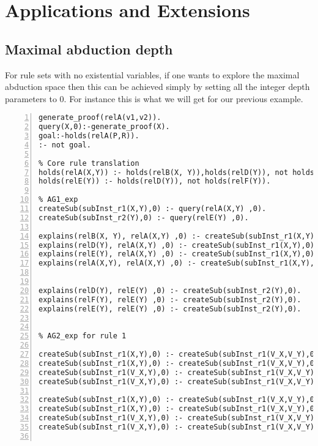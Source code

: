 \section{Applications and Extensions}\label{sec:applications_extensions}

\subsection{Maximal abduction depth}
For rule sets with no existential variables, if one wants to explore the maximal abduction space then this can be achieved simply by setting all the integer depth parameters to 0. For instance this is what we will get for our previous example.
\begin{lstlisting}[numbers=left]
% Encoding the goal
generate_proof(relA(v1,v2)).
query(X,0):-generate_proof(X).
goal:-holds(relA(P,R)).
:- not goal.

% Core rule translation
holds(relA(X,Y)) :- holds(relB(X, Y)),holds(relD(Y)), not holds(relE(Y)).
holds(relE(Y)) :- holds(relD(Y)), not holds(relF(Y)).

% AG1_exp
createSub(subInst_r1(X,Y),0) :- query(relA(X,Y) ,0).
createSub(subInst_r2(Y),0) :- query(relE(Y) ,0).

explains(relB(X, Y), relA(X,Y) ,0) :- createSub(subInst_r1(X,Y),0).
explains(relD(Y), relA(X,Y) ,0) :- createSub(subInst_r1(X,Y),0).
explains(relE(Y), relA(X,Y) ,0) :- createSub(subInst_r1(X,Y),0).
explains(relA(X,Y), relA(X,Y) ,0) :- createSub(subInst_r1(X,Y),0).


explains(relD(Y), relE(Y) ,0) :- createSub(subInst_r2(Y),0).
explains(relF(Y), relE(Y) ,0) :- createSub(subInst_r2(Y),0).
explains(relE(Y), relE(Y) ,0) :- createSub(subInst_r2(Y),0).


% AG2_exp for rule 1

createSub(subInst_r1(X,Y),0) :- createSub(subInst_r1(V_X,V_Y),0), holds(relA(X,Y)).
createSub(subInst_r1(X,Y),0) :- createSub(subInst_r1(V_X,V_Y),0), holds(relB(X,Y)).
createSub(subInst_r1(V_X,Y),0) :- createSub(subInst_r1(V_X,V_Y),0), holds(relD(Y)).
createSub(subInst_r1(V_X,Y),0) :- createSub(subInst_r1(V_X,V_Y),0), holds(relE(Y)).

createSub(subInst_r1(X,Y),0) :- createSub(subInst_r1(V_X,V_Y),0), query(relA(X,Y),0).
createSub(subInst_r1(X,Y),0) :- createSub(subInst_r1(V_X,V_Y),0), query(relB(X,Y),0).
createSub(subInst_r1(V_X,Y),0) :- createSub(subInst_r1(V_X,V_Y),0), query(relD(Y),0).
createSub(subInst_r1(V_X,Y),0) :- createSub(subInst_r1(V_X,V_Y),0), query(relF(Y),0).


\end{lstlisting}
